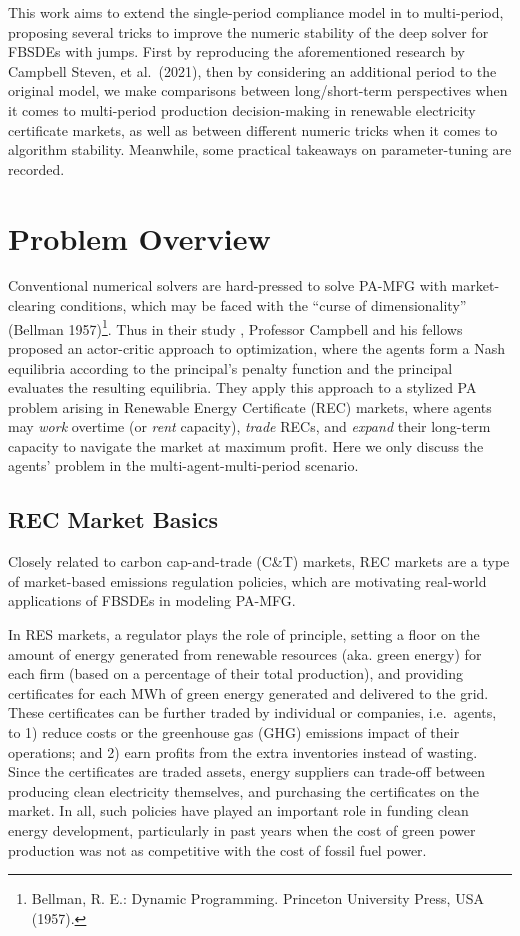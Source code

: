\documentclass[a4paper,10pt]{article}
\newcommand{\1}{\mathbf{1}}
\begin{document}
\normalsize This work aims to extend the single-period compliance model in \cite{SC} to
multi-period, proposing several tricks to improve the numeric stability of the deep solver for FBSDEs with jumps. First by reproducing the aforementioned research by Campbell Steven, et al.\ (2021), then by considering an additional period to the original model, we make comparisons between long/short-term perspectives when it comes to multi-period production decision-making in renewable electricity certificate markets, as well as between different numeric tricks when it comes to algorithm stability. Meanwhile, some practical takeaways on parameter-tuning are recorded.

\section{Problem Overview}

Conventional numerical solvers are hard-pressed to solve PA-MFG with
market-clearing conditions, which may be faced with the ``curse of
dimensionality'' (Bellman 1957)\footnote{Bellman, R. E.: Dynamic
  Programming. Princeton University Press, USA (1957).}. Thus in their
study \cite{SC}, Professor Campbell and his fellows proposed an actor-critic approach to optimization, where the agents form a Nash equilibria according to the principal's penalty function and the principal evaluates the resulting equilibria. They apply this approach to a stylized PA problem
arising in Renewable Energy Certificate (REC) markets, where agents may
\emph{work} overtime (or \emph{rent} capacity), \emph{trade} RECs, and
\emph{expand} their long-term capacity to navigate the market at maximum
profit. Here we only discuss the agents' problem in the
multi-agent-multi-period scenario.

\subsection{REC Market Basics}

Closely related to carbon cap-and-trade (C\&T) markets, REC markets are
a type of market-based emissions regulation policies, which are
motivating real-world applications of FBSDEs in modeling PA-MFG.

In RES markets, a regulator plays the role of principle, setting a floor
on the amount of energy generated from renewable resources (aka. green
energy) for each firm (based on a percentage of their total production),
and providing certificates for each MWh of green energy generated and
delivered to the grid. These certificates can be further traded by
individual or companies, i.e.~agents, to 1) reduce costs or the
greenhouse gas (GHG) emissions impact of their operations; and 2) earn
profits from the extra inventories instead of wasting. Since the
certificates are traded assets, energy suppliers can trade-off between
producing clean electricity themselves, and purchasing the certificates
on the market. In all, such policies have played an important role in
funding clean energy development, particularly in past years when the
cost of green power production was not as competitive with the cost of
fossil fuel power.
\end{document}
